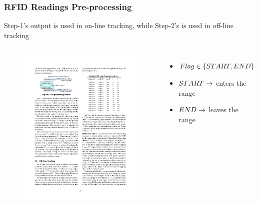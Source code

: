 
\begin{frame}
\frametitle{RFID Readings Pre-processing}

  \small{Step-1's output is used in on-line tracking, while Step-2's is used in off-line tracking}

  \begin{columns}[c]

    \begin{figure}[tb]
      \includegraphics[width=\columnwidth]{figures/2-1/2-1-8.pdf}
    \end{figure}

    \begin{itemize}
        \item $\mathnormal{Flag \in \{ START, END \}}$
        \item $\mathnormal{START} \rightarrow$ \textrm{enters the range}
        \item $\mathnormal{END} \rightarrow$ \textrm{leaves the range}
    \end{itemize}

  \end{columns}

\end{frame}

